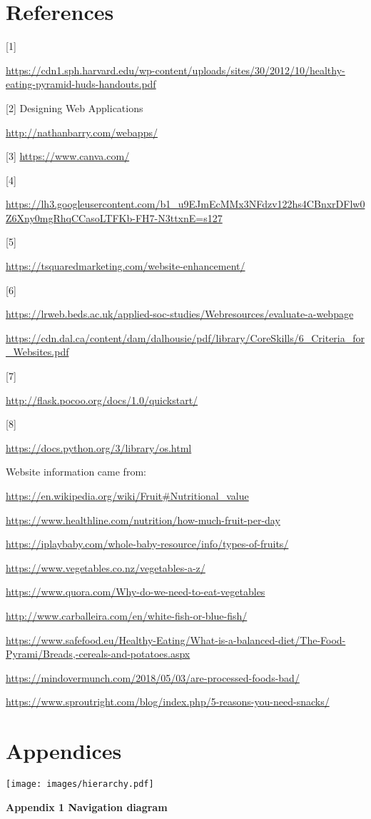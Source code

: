 \documentclass[10pt, a4paper]{article}
\begin{document}
    \section{References}

    [1]

    \url{https://cdn1.sph.harvard.edu/wp-content/uploads/sites/30/2012/10/healthy-eating-pyramid-huds-handouts.pdf}

    [2] Designing Web Applications

    \url{http://nathanbarry.com/webapps/}

    [3]
    \url{https://www.canva.com/}

    [4]

    \url{https://lh3.googleusercontent.com/b1_u9EJmEcMMx3NFdzv122hs4CBnxrDFlw0Z6Xny0mgRhqCCasoLTFKb-FH7-N3ttxnE=s127}

    [5]

    \url{https://tsquaredmarketing.com/website-enhancement/}

    [6]

    \url{https://lrweb.beds.ac.uk/applied-soc-studies/Webresources/evaluate-a-webpage}

    \url{https://cdn.dal.ca/content/dam/dalhousie/pdf/library/CoreSkills/6_Criteria_for_Websites.pdf}

    [7]

    \url{http://flask.pocoo.org/docs/1.0/quickstart/}

    [8]

    \url{https://docs.python.org/3/library/os.html}

    Website information came from:

    \url{https://en.wikipedia.org/wiki/Fruit#Nutritional_value}

    \url{https://www.healthline.com/nutrition/how-much-fruit-per-day}

    \url{https://iplaybaby.com/whole-baby-resource/info/types-of-fruits/}

    \url{https://www.vegetables.co.nz/vegetables-a-z/}

    \url{https://www.quora.com/Why-do-we-need-to-eat-vegetables}

    \url{http://www.carballeira.com/en/white-fish-or-blue-fish/}

    \url{https://www.safefood.eu/Healthy-Eating/What-is-a-balanced-diet/The-Food-Pyrami/Breads,-cereals-and-potatoes.aspx}

    \url{https://mindovermunch.com/2018/05/03/are-processed-foods-bad/}

    \url{https://www.sproutright.com/blog/index.php/5-reasons-you-need-snacks/}

    \section{Appendices}

    \texttt{[image: images/hierarchy.pdf]}

    \textbf{Appendix 1 Navigation diagram}
    \vspace{2mm}
\end{document}
